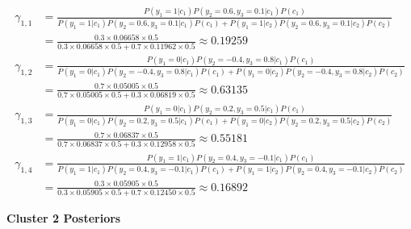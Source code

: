 \documentclass[12pt]{article}
\begin{document}
\begin{enumerate}[leftmargin=\labelsep]
          \vskip -0.5cm
          \begingroup
          \addtolength{\jot}{0.5em}
          \begin{align*}
              \gamma_{1,1} & = \frac{P(y_1=1|c_1)P(y_2=0.6,y_3=0.1|c_1)P(c_1)}{P(y_1=1|c_1)P(y_2=0.6,y_3=0.1|c_1)P(c_1) + P(y_1=1|c_2)P(y_2=0.6,y_3=0.1|c_2)P(c_2)} \\
                           & = \frac{0.3 \times 0.06658 \times 0.5}{0.3 \times 0.06658 \times 0.5 + 0.7 \times 0.11962 \times 0.5} \approx 0.19259 \\
              \gamma_{1,2} & = \frac{P(y_1=0|c_1)P(y_2=-0.4,y_3=0.8|c_1)P(c_1)}{P(y_1=0|c_1)P(y_2=-0.4,y_3=0.8|c_1)P(c_1) + P(y_1=0|c_2)P(y_2=-0.4,y_3=0.8|c_2)P(c_2)} \\
                           & = \frac{0.7 \times 0.05005 \times 0.5}{0.7 \times 0.05005 \times 0.5 + 0.3 \times 0.06819 \times 0.5} \approx 0.63135 \\
              \gamma_{1,3} & = \frac{P(y_1=0|c_1)P(y_2=0.2,y_3=0.5|c_1)P(c_1)}{P(y_1=0|c_1)P(y_2=0.2,y_3=0.5|c_1)P(c_1) + P(y_1=0|c_2)P(y_2=0.2,y_3=0.5|c_2)P(c_2)} \\
                           & = \frac{0.7 \times 0.06837 \times 0.5}{0.7 \times 0.06837 \times 0.5 + 0.3 \times 0.12958 \times 0.5} \approx 0.55181 \\
              \gamma_{1,4} & = \frac{P(y_1=1|c_1)P(y_2=0.4,y_3=-0.1|c_1)P(c_1)}{P(y_1=1|c_1)P(y_2=0.4,y_3=-0.1|c_1)P(c_1) + P(y_1=1|c_2)P(y_2=0.4,y_3=-0.1|c_2)P(c_2)} \\
                           & = \frac{0.3 \times 0.05905 \times 0.5}{0.3 \times 0.05905 \times 0.5 + 0.7 \times 0.12450 \times 0.5} \approx 0.16892
          \end{align*}
          \endgroup

          \begin{center}
              \textbf{\colorbox{byellow}{Cluster 2 Posteriors}}
          \end{center}


\end{enumerate}
\end{document}
